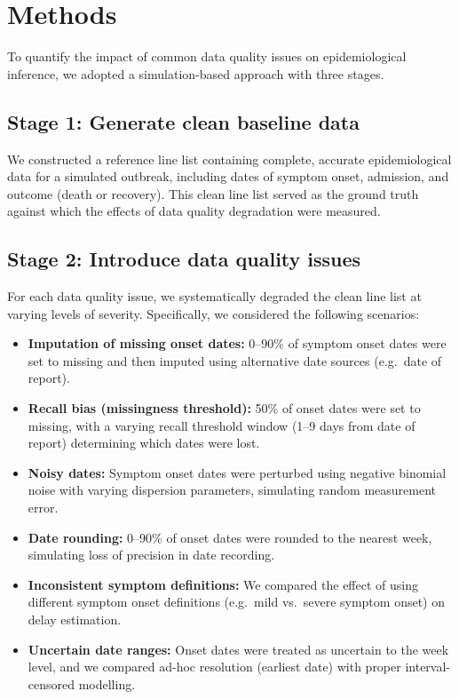 \documentclass[11pt,a4paper]{article}
\begin{document}
\section{Methods}

To quantify the impact of common data quality issues on epidemiological inference, we adopted a simulation-based approach with three stages.

\subsection{Stage 1: Generate clean baseline data}

We constructed a reference line list containing complete, accurate epidemiological data for a simulated outbreak, including dates of symptom onset, admission, and outcome (death or recovery).
This clean line list served as the ground truth against which the effects of data quality degradation were measured.

\subsection{Stage 2: Introduce data quality issues}

For each data quality issue, we systematically degraded the clean line list at varying levels of severity.
Specifically, we considered the following scenarios:
\begin{itemize}
  \item \textbf{Imputation of missing onset dates:} 0--90\% of symptom onset dates were set to missing and then imputed using alternative date sources (e.g.\ date of report).
  \item \textbf{Recall bias (missingness threshold):} 50\% of onset dates were set to missing, with a varying recall threshold window (1--9 days from date of report) determining which dates were lost.
  \item \textbf{Noisy dates:} Symptom onset dates were perturbed using negative binomial noise with varying dispersion parameters, simulating random measurement error.
  \item \textbf{Date rounding:} 0--90\% of onset dates were rounded to the nearest week, simulating loss of precision in date recording.
  \item \textbf{Inconsistent symptom definitions:} We compared the effect of using different symptom onset definitions (e.g.\ mild vs.\ severe symptom onset) on delay estimation.
  \item \textbf{Uncertain date ranges:} Onset dates were treated as uncertain to the week level, and we compared ad-hoc resolution (earliest date) with proper interval-censored modelling.
\end{itemize}
\end{document}
